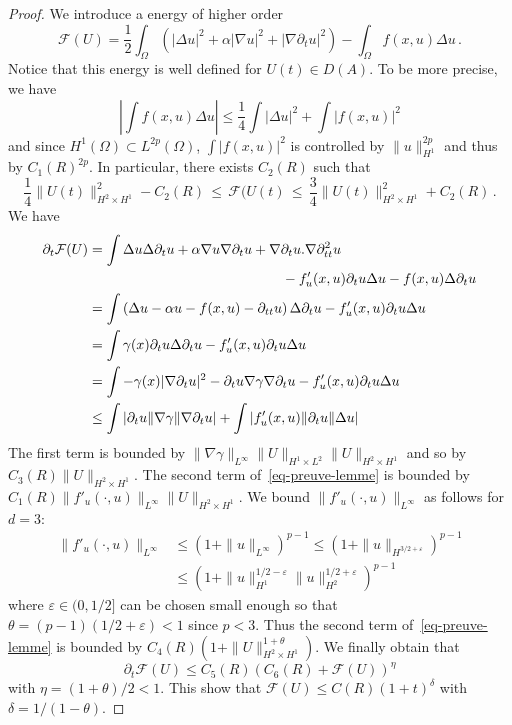 \documentclass[10pt]{amsart}
\theoremstyle{definition}\newtheorem{defi}[theo]{Definition}\newtheorem{rema}[theo]{Remark}\newtheorem{exam}[theo]{Example}\newtheorem{exem}[theo]{Example}\newtheorem{nota}[theo]{Notation}
\newcommand{\Fc}{\mathcal{F}}
\newcommand{\grad}{\nabla}
\begin{document}
\begin{proof}
We introduce a energy of higher order
\[
\Fc(U)=\frac 12 \int_\Omega \left(|\Delta u|^2 + \alpha|\grad u|^2 +
|\grad \partial_t u|^2\right) - \int_\Omega f(x,u)\Delta u\,.
\]
Notice that this energy is well defined for $U(t)\in D(A)$. To be more precise, we have
\[
\left|\int f(x,u)\Delta u \right| \leq \frac 14 \int |\Delta u|^2 + \int
|f(x,u)|^2
\]
and since $H^1(\Omega)\subset L^{2p}(\Omega)$, $\int |f(x,u)|^2$ is controlled by $\|u\|_{H^1}^{2p}$ and thus by $C_1(R)^{2p}$. In particular, there exists $C_2(R)$ such that
\[
\frac 14 \|U(t)\|_{H^2\times H^1}^2 - C_2(R)\,\leq\,\Fc(U(t)\,\leq\,\frac 34
\|U(t)\|_{H^2\times H^1}^2 + C_2(R)\,.
\]
We have
\begin{equation}\label{eq-preuve-lemme}
\begin{aligned}
\partial_t \Fc(U)&=\int \Delta u\Delta \partial_tu + \alpha \grad u\grad\partial_t u + \grad\partial_tu.\grad\partial_{tt}^2 u\\
&\mkern250mu- f'_{u}(x,u)\partial_t u \Delta u - f(x,u) \Delta\partial_t u \\
&= \int \left(\Delta u - \alpha u - f(x,u) -\partial_{tt}u\right)\Delta\partial_t u - f'_{u}(x,u)\partial_t u \Delta u \\\
&= \int \gamma(x)\partial_t u \Delta\partial_t u - f'_{u}(x,u)\partial_t u \Delta u\\
&= \int - \gamma(x) |\grad\partial_t u|^2 - \partial_t u \grad \gamma\grad
\partial_t u - f'_{u}(x,u)\partial_t u \Delta u\\
&\leq \int |\partial_t u\|\grad \gamma\|\grad
\partial_t u| + \int |f'_{u}(x,u)\|\partial_t u\|\Delta u|
\end{aligned}
\end{equation}
The first term is bounded by $\|\grad\gamma\|_{L^\infty}\|U\|_{H^1\times L^2}\|U\|_{H^2\times H^1}$ and so by $C_3(R)\|U\|_{H^2\times H^1}$. The second term of~\eqref{eq-preuve-lemme} is bounded by $C_1(R) \|f'_u(\cdot,u)\|_{L^\infty} \|U\|_{H^2\times H^1}$. We bound $\|f'_u(\cdot,u)\|_{L^\infty}$ as follows for $d=3$:
\begin{align*}
\|f'_u(\cdot,u)\|_{L^\infty}&\leq (1+\|u\|_{L^\infty})^{p-1} \leq (1+\|u\|_{H^{3/2+\varepsilon}})^{p-1}\\
&\leq \left(1+\|u\|_{H^1}^{1/2-\varepsilon}\|u\|_{H^2}^{1/2+\varepsilon}\right)^{p-1}
\end{align*}
where $\varepsilon\in (0,1/2]$ can be chosen small enough so that $\theta=(p-1)(1/2+\varepsilon)<1$ since $p<3$. Thus the second term of~\eqref{eq-preuve-lemme} is bounded by $C_4(R)(1+\|U\|_{H^2\times H^1}^{1+\theta})$. We finally obtain that
\[
\partial_t \Fc(U) \leq C_5(R) (C_6(R) + \Fc(U))^\eta
\]
with $\eta=(1+\theta)/2<1$. This show that $\Fc(U)\leq C(R) (1+t)^\delta$ with $\delta=1/(1-\theta)$.


\end{proof}
\end{document}
